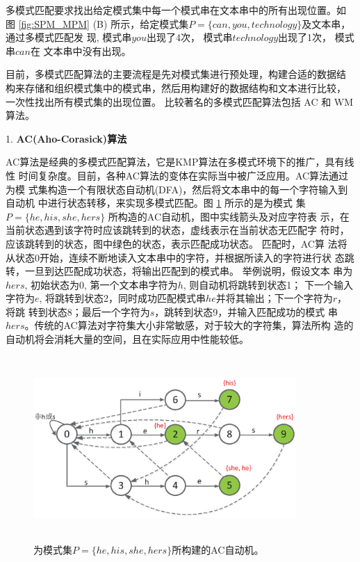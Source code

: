 多模式匹配要求找出给定模式集中每一个模式串在文本串中的所有出现位置。如
图 \ref{fig:SPM_MPM} (B)
所示，给定模式集$P=\{can, you, technology\}$及文本串，通过多模式匹配发
现, 模式串$you$出现了4次， 模式串$technology$出现了1次， 模式串$can$在
文本串中没有出现。

目前，多模式匹配算法的主要流程是先对模式集进行预处理，构建合适的数据结
构来存储和组织模式集中的模式串，然后用构建好的数据结构和文本进行比较，
一次性找出所有模式集的出现位置。 比较著名的多模式匹配算法包括 AC
\cite{Aho1975} 和 WM \cite{Wu1994} 算法。

1. \textbf{AC(Aho-Corasick)算法}

AC算法是经典的多模式匹配算法，它是KMP算法在多模式环境下的推广，具有线性
时间复杂度。目前，各种AC算法的变体在实际当中被广泛应用。AC算法通过为模
式集构造一个有限状态自动机(DFA)，然后将文本串中的每一个字符输入到自动机
中进行状态转移，来实现多模式匹配。图 \ref{fig:AC} 所示的是为模式
集$P=\{he, his, she, hers\}$ 所构造的AC自动机，图中实线箭头及对应字符表
示，在当前状态遇到该字符时应该跳转到的状态，虚线表示在当前状态无匹配字
符时，应该跳转到的状态，图中绿色的状态，表示匹配成功状态。 匹配时，AC算
法将从状态0开始，连续不断地读入文本串中的字符，并根据所读入的字符进行状
态跳转，一旦到达匹配成功状态，将输出匹配到的模式串。 举例说明，假设文本
串为$hers$, 初始状态为0, 第一个文本串字符为$h$, 则自动机将跳转到状态1；
下一个输入字符为$e$,
将跳转到状态2，同时成功匹配模式串$he$并将其输出；下一个字符为$r$，将跳
转到状态8；最后一个字符为$s$，跳转到状态9，并输入匹配成功的模式
串$hers$。传统的AC算法对字符集大小非常敏感，对于较大的字符集，算法所构
造的自动机将会消耗大量的空间，且在实际应用中性能较低。


\begin{figure}[H]
  \centering
  \includegraphics[height=7cm ,width=10cm]{figures/1_Introduction/AC.eps}
  \caption{为模式集$P=\{he, his, she, hers\}$所构建的AC自动机。}
  \label{fig:AC}
\end{figure}


